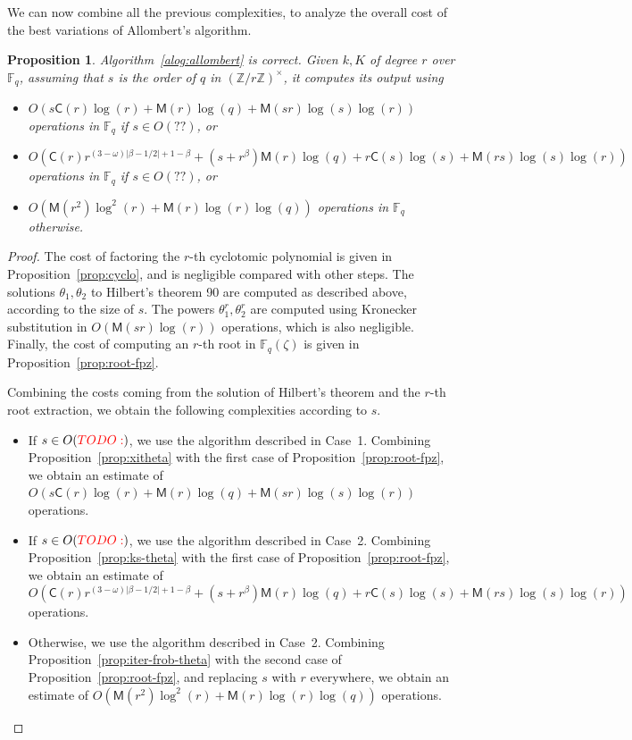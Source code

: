 \documentclass[12pt]{article}
\theoremstyle{plain}
\newtheorem{proposition}[theorem]{Proposition}
\theoremstyle{definition}
\newcommand{\todo}[1]{\textcolor{red}{TODO: #1}}
\def\Z{\ensuremath{\mathbb{Z}}}
\def\F{\ensuremath{\mathbb{F}}}
\def\MM{\ensuremath{\mathsf{M}}}
\def\CC{\ensuremath{\mathsf{C}}}
\newcounter{algorithm}
\begin{document}
We can now combine all the previous complexities, to analyze the
overall cost of the best variations of Allombert's algorithm.

\begin{proposition}
  \label{proposition:XiDelta-updated}
  Algorithm~\ref{alog:allombert} is correct. Given $k,K$ of degree $r$
  over $\F_q$, assuming that $s$ is the order of $q$ in
  $(\Z/r\Z)^\times$, it computes its output using
  \begin{itemize}
  \item $O(s\CC(r)\log(r)+\MM(r)\log(q)+\MM(sr)\log(s)\log(r))$
    operations in $\F_q$ if $s \in O(??)$, or
  \item
    $O(\CC(r)r^{(3-\omega)\lvert\beta-1/2\rvert+1-\beta}+(s+r^\beta)\MM(r)\log(q)+r\CC(s)\log(s)+\MM(rs)\log(s)\log(r))$
    operations in $\F_q$ if $s \in O(??)$, or
  \item $O(\MM(r^2)\log^2(r) + \MM(r)\log(r)\log(q))$ operations in
    $\F_q$ otherwise.
  \end{itemize}
\end{proposition}
\begin{proof}
  The cost of factoring the $r$-th cyclotomic polynomial is given in
  Proposition~\ref{prop:cyclo}, and is negligible compared with other
  steps. %
  The solutions $\theta_1,\theta_2$ to Hilbert's theorem 90 are
  computed as described above, according to the size of $s$. %
  The powers $\theta_1^r,\theta_2^r$ are computed using Kronecker
  substitution in $O(\MM(sr)\log(r))$ operations, which is also
  negligible. %
  Finally, the cost of computing an $r$-th root in $\F_q(\zeta)$ is
  given in Proposition~\ref{prop:root-fpz}. %

  Combining the costs coming from the solution of Hilbert's theorem
  and the $r$-th root extraction, we obtain the following complexities
  according to $s$.
  \begin{itemize}
  \item If $s\in O(\todo{})$, we use the algorithm described in
    Case~1. Combining Proposition~\ref{prop:xitheta} with the first
    case of Proposition~\ref{prop:root-fpz}, we obtain an estimate of
    $O(s\CC(r)\log(r)+\MM(r)\log(q)+\MM(sr)\log(s)\log(r))$
    operations.
  \item If $s\in O(\todo{})$, we use the algorithm described in
    Case~2. Combining Proposition~\ref{prop:ks-theta} with the first
    case of Proposition~\ref{prop:root-fpz}, we obtain an estimate of
    $O(\CC(r)r^{(3-\omega)\lvert\beta-1/2\rvert+1-\beta}+(s+r^\beta)\MM(r)\log(q)+r\CC(s)\log(s)+\MM(rs)\log(s)\log(r))$
    operations.
  \item Otherwise, we use the algorithm described in Case~2. Combining
    Proposition~\ref{prop:iter-frob-theta} with the second case of
    Proposition~\ref{prop:root-fpz}, and replacing $s$ with $r$
    everywhere, we obtain an estimate of
    $O(\MM(r^2)\log^2(r) + \MM(r)\log(r)\log(q)) $ operations.
    \qedhere
  \end{itemize}
\end{proof}
\end{document}
